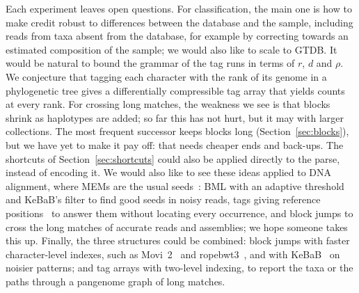Each experiment leaves open questions.
For classification, the main one is how to make credit robust to differences between the database and the sample, including reads from taxa absent from the database, for example by correcting towards an estimated composition of the sample; we would also like to scale to GTDB.
It would be natural to bound the grammar of the tag runs in terms of $r$, $d$ and $\rho$.
We conjecture that tagging each character with the rank of its genome in a phylogenetic tree gives a differentially compressible tag array that yields counts at every rank.
For crossing long matches, the weakness we see is that blocks shrink as haplotypes are added; so far this has not hurt, but it may with larger collections.
The most frequent successor keeps blocks long (Section~\ref{sec:blocks}), but we have yet to make it pay off: that needs cheaper ends and back-ups.
The shortcuts of Section~\ref{sec:shortcuts} could also be applied directly to the parse, instead of encoding it.
We would also like to see these ideas applied to DNA alignment, where MEMs are the usual seeds~\cite{RossiEtAl2022,VarkiEtAl2025}: BML with an adaptive threshold and KeBaB's filter to find good seeds in noisy reads, tags giving reference positions~\cite{BalazEtAl2024,OO26} to answer them without locating every occurrence, and block jumps to cross the long matches of accurate reads and assemblies; we hope someone takes this up.
Finally, the three structures could be combined: block jumps with faster character-level indexes, such as Movi~2~\cite{ZakeriEtAl2026} and ropebwt3~\cite{Li2024}, and with KeBaB~\cite{BrownEtAl2025KeBaB} on noisier patterns; and tag arrays with two-level indexing, to report the taxa or the paths through a pangenome graph of long matches.
